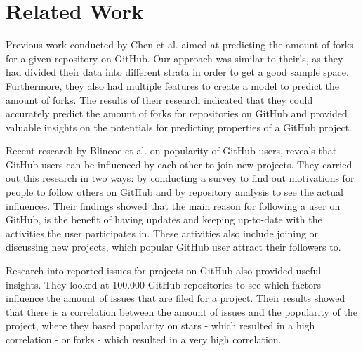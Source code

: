 \section{Related Work}
Previous work conducted by Chen et al.\cite{chen-2014} aimed at predicting the amount of forks for a given repository on GitHub.
Our approach was similar to their's, as they had divided their data into different strata in order to get a good sample space.
Furthermore, they also had multiple features to create a model to predict the amount of forks.
The results of their research indicated that they could accurately predict the amount of forks for repositories on GitHub and provided valuable insights on the potentials for predicting properties of a GitHub project.

Recent research by Blincoe et al.\cite{blincoe-2015} on popularity of GitHub users, reveals that GitHub users can be influenced by each other to join new projects.
They carried out this research in two ways: by conducting a survey to find out motivations for people to follow others on GitHub and by repository analysis to see the actual influences.
Their findings showed that the main reason for following a user on GitHub, is the benefit of having updates and keeping up-to-date with the activities the user participates in.
These activities also include joining or discussing new projects, which popular GitHub user attract their followers to.

Research\cite{bissyande-2013} into reported issues for projects on GitHub also provided useful insights.
They looked at 100.000 GitHub repositories to see which factors influence the amount of issues that are filed for a project.
Their results showed that there is a correlation between the amount of issues and the popularity of the project, where they based popularity on stars - which resulted in a high correlation - or forks - which resulted in a very high correlation.


